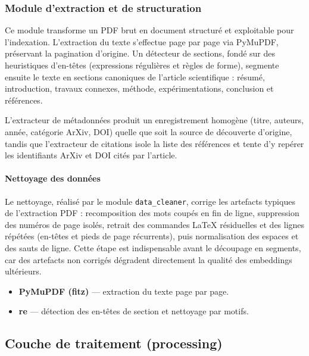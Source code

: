 \subsubsection{Module d'extraction et de structuration}

Ce module transforme un PDF brut en document structuré et exploitable pour
l'indexation. L'extraction du texte s'effectue page par page via PyMuPDF, préservant
la pagination d'origine. Un détecteur de sections, fondé sur des heuristiques
d'en-têtes (expressions régulières et règles de forme), segmente ensuite le texte en
sections canoniques de l'article scientifique : résumé, introduction, travaux
connexes, méthode, expérimentations, conclusion et références.

L'extracteur de métadonnées produit un enregistrement homogène (titre, auteurs,
année, catégorie ArXiv, DOI) quelle que soit la source de découverte d'origine, tandis
que l'extracteur de citations isole la liste des références et tente d'y repérer les
identifiants ArXiv et DOI cités par l'article.

\paragraph{Nettoyage des données}

Le nettoyage, réalisé par le module \texttt{data\_cleaner}, corrige les artefacts
typiques de l'extraction PDF : recomposition des mots coupés en fin de ligne,
suppression des numéros de page isolés, retrait des commandes LaTeX résiduelles et
des lignes répétées (en-têtes et pieds de page récurrents), puis normalisation des
espaces et des sauts de ligne. Cette étape est indispensable avant le découpage en
segments, car des artefacts non corrigés dégradent directement la qualité des
embeddings ultérieurs.

\begin{encadre}
\begin{itemize}
  \item \textbf{PyMuPDF (fitz)} — extraction du texte page par page.
  \item \textbf{re} — détection des en-têtes de section et nettoyage par motifs.
\end{itemize}
\end{encadre}

\subsection{Couche de traitement (processing)}

